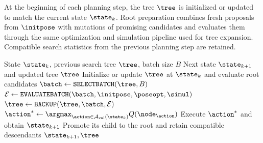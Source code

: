 At the beginning of each planning step, the tree $\tree$ is initialized or updated to match the current state $\state_k$. 
Root preparation combines fresh proposals from $\initpose$ with mutations of promising candidates and evaluates them through the same optimization and simulation pipeline used for tree expansion. 
Compatible search statistics from the previous planning step are retained.

\begin{algorithm}[t]
    \caption{Batched receding-horizon MCTS for sequence planning}
    \label{alg:mcts}
    \begin{algorithmic}[1]
        \Require State $\state_k$, previous search tree $\tree$, batch size $B$
        \Ensure Next state $\state_{k+1}$ and updated tree $\tree$
        \State Initialize or update $\tree$ at $\state_k$ and evaluate root candidates
            \State $\batch\gets\texttt{SELECTBATCH}(\tree,B)$
            \State $\mathcal{E}\gets\texttt{EVALUATEBATCH}(\batch,\initpose,\poseopt,\simul)$
            \State $\tree\gets\texttt{BACKUP}(\tree,\batch,\mathcal{E})$
        \EndWhile
        \State $\action^*\gets\argmax_{\action\in\mathcal{A}_{\mathrm{val}}(\state_k)} Q(\node_{\action})$
        \State Execute $\action^*$ and obtain $\state_{k+1}$
        \State Promote its child to the root and retain compatible descendants
        \State \Return $\state_{k+1},\tree$
    \end{algorithmic}
\end{algorithm}

